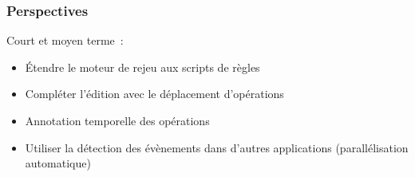 \begin{frame}
	\frametitle{Perspectives}
	Court et moyen terme~:
	\begin{itemize}
		\item<1-> Étendre le moteur de rejeu aux scripts de règles
		\item<2-> Compléter l'édition avec le déplacement d'opérations
		\item<3-> Annotation temporelle des opérations
	\end{itemize}
	\begin{itemize}
		\item<4> Utiliser la détection des évènements dans d'autres applications (parallélisation automatique)
	\end{itemize}
\end{frame}

